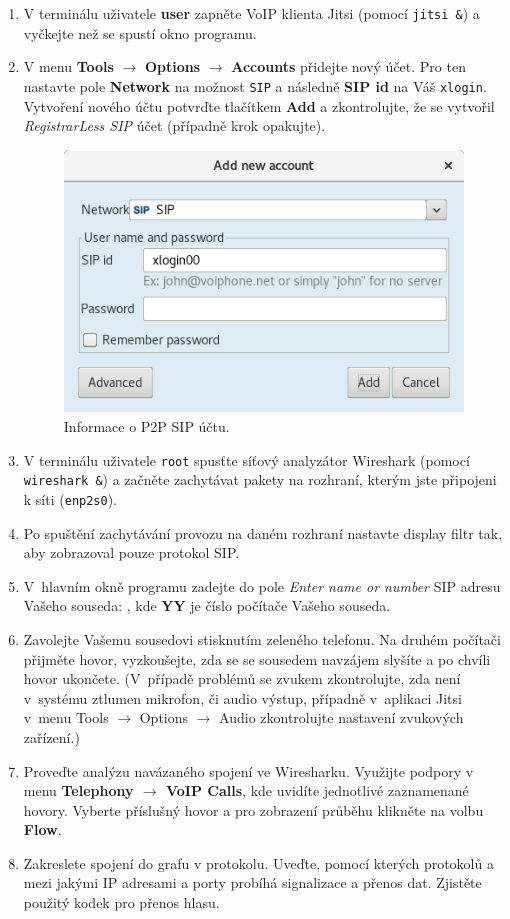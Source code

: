 \begin{enumerate}
    \item V terminálu uživatele {\bf user} zapněte VoIP klienta Jitsi (pomocí {\tt jitsi \&}) a vyčkejte než se spustí okno programu.
    \item V menu {\bf Tools} $\rightarrow$ {\bf Options} $\rightarrow$ {\bf Accounts} přidejte nový účet. Pro ten nastavte pole {\bf Network} na možnost {\tt SIP} a následně {\bf SIP id} na Váš {\tt xlogin}.
    Vytvoření nového účtu potvrďte tlačítkem {\bf Add} a zkontrolujte, že se vytvořil {\it RegistrarLess SIP} účet (případně krok opakujte).
    \begin{figure}[h!]
    	\centering
    	\includegraphics[scale=0.5]{img/account_p2p.png}
    	\caption{Informace o P2P SIP účtu.}
    	\label{fig:sip_account}
    \end{figure}
    \item V terminálu uživatele {\tt root} spusťte síťový analyzátor Wireshark (pomocí {\tt wireshark \&}) a začněte zachytávat pakety na rozhraní, kterým jste připojeni k síti ({\tt enp2s0}).
    \item Po spuštění zachytávání provozu na daném rozhraní nastavte display filtr tak, aby zobrazoval pouze protokol SIP.
    \item V hlavním okně programu zadejte do pole {\it Enter name or number} SIP adresu Vašeho souseda: , kde {\bf YY} je číslo počítače Vašeho souseda.
    \item Zavolejte Vašemu sousedovi stisknutím zeleného telefonu. Na druhém počítači přijměte hovor, vyzkoušejte, zda se se sousedem navzájem slyšíte a po chvíli hovor ukončete.
(V případě problémů se zvukem zkontrolujte, zda není v systému ztlumen mikrofon, či audio výstup, případně v aplikaci Jitsi v menu Tools $\rightarrow$ Options $\rightarrow$ Audio zkontrolujte nastavení zvukových zařízení.) 
    \item Proveďte analýzu navázaného spojení ve Wiresharku. Využijte podpory v menu {\bf Telephony $\rightarrow$ VoIP Calls}, kde uvidíte jednotlivé zaznamenané hovory. Vyberte příslušný hovor a pro zobrazení průběhu klikněte na volbu {\bf Flow}.
    \item Zakreslete spojení do grafu v protokolu. Uveďte, pomocí kterých protokolů a mezi jakými IP adresami a porty probíhá signalizace a přenos dat. Zjistěte použitý kodek pro přenos hlasu.
\end{enumerate}
